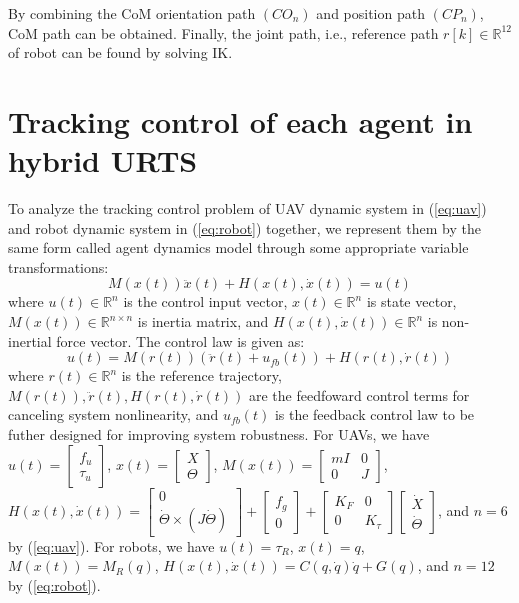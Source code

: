 \documentclass{ieeeaccess}
\begin{document}
By combining the CoM orientation path $(CO_n)$ and position path $(CP_n)$, CoM path can be obtained. Finally, the joint path, i.e., reference path $r[k]\in\mathbb{R}^{12}$ of robot can be found by solving IK.

\section{Tracking control of each agent in hybrid URTS}
To analyze the tracking control problem of UAV dynamic system in (\ref{eq:uav}) and robot dynamic system in (\ref{eq:robot}) together, we represent them by the same form called agent dynamics model through some appropriate variable transformations:
\begin{equation} \label{eq:agent} 
    M(x(t))\ddot{x}(t) + H(x(t),\dot{x}(t)) = u(t)
\end{equation}
where $u(t)\in\mathbb{R}^n$ is the control input vector, $x(t)\in\mathbb{R}^n$ is state vector, $M(x(t))\in\mathbb{R}^{n\times n}$ is inertia matrix, and $H(x(t),\dot{x}(t))\in\mathbb{R}^n$ is non-inertial force vector. The control law is given as:
\begin{equation} \label{eq:control}
    u(t)= M(r(t))(\ddot{r}(t) + u_{fb}(t)) + H(r(t),\dot{r}(t)) 
\end{equation}
where $r(t)\in\mathbb{R}^n$ is the reference trajectory, $M(r(t)), \ddot{r}(t)\mathbin{,} H(r(t), \dot{r}(t))$ are the feedfoward control terms for canceling system nonlinearity, and $u_{fb}(t)$ is the feedback control law to be futher designed for improving system robustness. For UAVs, we have $u(t)=\begin{bmatrix}
    f_u \\ \tau_u
\end{bmatrix}$, $x(t)=\begin{bmatrix}
    X \\ \Theta
\end{bmatrix}$, $M(x(t))=\begin{bmatrix}
    mI & 0 \\ 0 & J
\end{bmatrix}$, $H(x(t),\dot{x}(t))=\begin{bmatrix}
    0 \\ \dot{\Theta}\times(J\dot{\Theta})
\end{bmatrix}+\begin{bmatrix}
    f_g \\ 0
\end{bmatrix}+\begin{bmatrix}
    K_F & 0 \\
    0 & K_\tau
\end{bmatrix}\begin{bmatrix}
    \dot{X} \\ \dot{\Theta}
\end{bmatrix}$, and $n=6$ by (\ref{eq:uav}). For robots, we have $u(t)=\tau_R$, $x(t)=q$, $M(x(t))=M_R(q)$, $H(x(t),\dot{x}(t))=C(q,\dot{q})\dot{q} + G(q)$, and $n=12$ by (\ref{eq:robot}).
\end{document}
